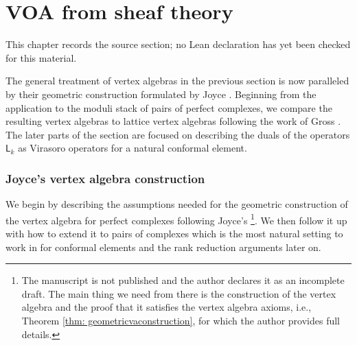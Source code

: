 \chapter{VOA from sheaf theory}
\label{virasoro-constraints-moduli-sheaves-vertex-algebras-chapter-04}

\begin{remark}
\label{virasoro-constraints-moduli-sheaves-vertex-algebras-chapter-04-source}
This chapter records the source section; no Lean declaration has yet been checked for this material.
\notready
\end{remark}

\label{sec: VOA from sheaf theory}
The general treatment of vertex algebras in the previous section is now paralleled by their geometric construction formulated by Joyce \cite{Jo17}. Beginning from the application to the moduli stack of pairs of perfect complexes, we compare the resulting vertex algebras to lattice vertex algebras following the work of Gross \cite{Gr19}. The later parts of the section are focused on describing the duals of the operators $\mathsf{L}_k$ as Virasoro operators for a natural conformal element.


\subsection{Joyce's vertex algebra construction}\label{sec: Joycevertexalgebra}

We begin by describing the assumptions needed for the geometric construction of the vertex algebra for perfect complexes following Joyce's \cite{Jo17}\footnote{The manuscript \cite{Jo17} is not published and the author declares it as an incomplete draft. The main thing we need from there is the construction of the vertex algebra and the proof that it satisfies the vertex algebra axioms, i.e., Theorem \ref{thm: geometricvaconstruction}, for which the author provides full details.}. We then follow it up with how to extend it to pairs of complexes which is the most natural setting to work in for conformal elements and the rank reduction arguments later on.

